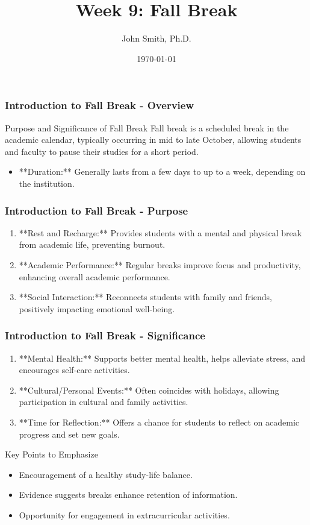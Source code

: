 \documentclass[aspectratio=169]{beamer}
\title[Week 9: Fall Break]{Week 9: Fall Break}
\author{John Smith, Ph.D.}
\institute[University Name]{Department of Education, University Name}
\date{\today}
\begin{document}
\frame{\titlepage}

\begin{frame}[fragile]
    \frametitle{Introduction to Fall Break - Overview}
    \begin{block}{Purpose and Significance of Fall Break}
        Fall break is a scheduled break in the academic calendar, typically occurring in mid to late October, allowing students and faculty to pause their studies for a short period.
    \end{block}
    \begin{itemize}
        \item **Duration:** Generally lasts from a few days to up to a week, depending on the institution.
    \end{itemize}
\end{frame}

\begin{frame}[fragile]
    \frametitle{Introduction to Fall Break - Purpose}
    \begin{enumerate}
        \item **Rest and Recharge:** Provides students with a mental and physical break from academic life, preventing burnout.
        
        \item **Academic Performance:** Regular breaks improve focus and productivity, enhancing overall academic performance.
        
        \item **Social Interaction:** Reconnects students with family and friends, positively impacting emotional well-being.
    \end{enumerate}
\end{frame}

\begin{frame}[fragile]
    \frametitle{Introduction to Fall Break - Significance}
    \begin{enumerate}
        \item **Mental Health:** Supports better mental health, helps alleviate stress, and encourages self-care activities.
        
        \item **Cultural/Personal Events:** Often coincides with holidays, allowing participation in cultural and family activities.
        
        \item **Time for Reflection:** Offers a chance for students to reflect on academic progress and set new goals.
    \end{enumerate}
    \begin{block}{Key Points to Emphasize}
        \begin{itemize}
            \item Encouragement of a healthy study-life balance.
            \item Evidence suggests breaks enhance retention of information.
            \item Opportunity for engagement in extracurricular activities.
        \end{itemize}
    \end{block}
\end{frame}
\end{document}
